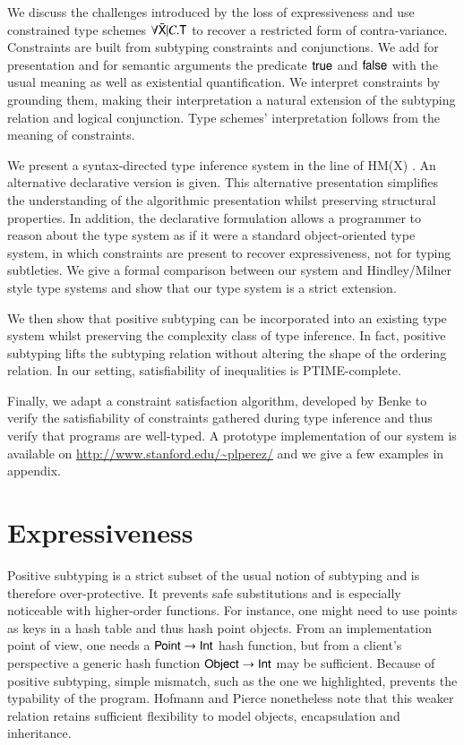 \documentclass{report}
\begin{document}
  We discuss the challenges introduced by the loss of expressiveness
  and use constrained type schemes $\forall\bar{\textsf{X}}|C.\textsf{T}$ to recover a restricted
  form of contra-variance. Constraints are built from subtyping constraints and conjunctions.
  We add for presentation and for semantic arguments the predicate $\textsf{true}$ and $\textsf{false}$
  with the usual meaning as well as existential quantification. We interpret constraints
  by grounding them, making their interpretation a natural extension of the subtyping relation
  and logical conjunction. Type schemes' interpretation follows from the meaning of constraints.
  
  We present a syntax-directed type inference system in the line of HM(X)
  \cite{sulzmann97type}. An alternative declarative version is given. This alternative
  presentation simplifies the understanding of the
  algorithmic presentation whilst preserving structural properties.
  In addition, the declarative formulation allows a programmer to reason about the type system
  as if it were a standard object-oriented type system, in which constraints are present
  to recover expressiveness, not for typing subtleties.
  We give a formal comparison between our system and Hindley/Milner style type systems
  and show that our type system is a strict extension.
  
  We then show that positive subtyping can be incorporated into an existing type
  system whilst preserving the complexity class of type inference. In fact, positive
  subtyping lifts the subtyping relation without altering the shape of the
  ordering relation. In our setting, satisfiability of inequalities
  is PTIME-complete.
  
  Finally, we adapt a constraint satisfaction algorithm, developed
  by Benke \cite{benke93} to verify the satisfiability of constraints gathered
  during type inference and thus verify that programs are well-typed.
  A prototype implementation of our system
  is available on \url{http://www.stanford.edu/~plperez/} and we give a few examples
  in appendix.
  
  \section{Expressiveness}
  Positive subtyping is a strict subset of the usual notion of subtyping and
  is therefore over-protective. It prevents safe substitutions and is especially
  noticeable with higher-order
  functions. For instance, one might need to use points as keys in a hash table and
  thus hash point objects. From an implementation point of view, one needs a
  $\textsf{Point}\rightarrow\textsf{Int}$ hash function, but from a client's perspective a
  generic hash function $\textsf{Object}\rightarrow\textsf{Int}$ may be sufficient.
  Because of positive subtyping, simple mismatch, such as the one we highlighted,
  prevents the typability of the program. Hofmann and Pierce
  \cite{pierce:positive-subtyping} nonetheless note that this weaker relation
  retains sufficient flexibility to model objects, encapsulation and inheritance.
  
\end{document}
